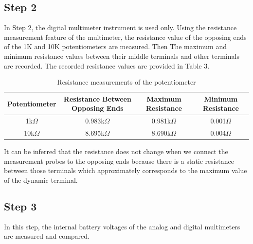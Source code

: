 \documentclass[letterpaper,12pt]{article}
\begin{document}
\subsection{Step 2}
In Step 2, the digital multimeter instrument is used only. Using the resistance measurement feature of the multimeter, the resistance value of the opposing ends of the 1K and 10K potentiometers are measured. Then The maximum and minimum resistance values between their middle terminals and other terminals are recorded.
The recorded resistance values are provided in Table 3.
\begin{table}[H]
	\begin{center}
		\caption{Resistance measurements of the potentiometer}
		\vspace{2mm}
		\begin{tabular}{|| c | c | c | c ||} 
		 \hline
		 Potentiometer & Resistance Between Opposing Ends &  Maximum Resistance & Minimum Resistance\\ [0.5ex] 
		 \hline\hline
		 1k\( \Omega \) & 0.983k\( \Omega \) & 0.981k\( \Omega \) & 0.001\( \Omega \) \\ 
		 \hline
	     10k\( \Omega \) & 8.695k\( \Omega \) & 8.690k\( \Omega \) & 0.004\( \Omega \)  \\
		 \hline
		\end{tabular}
	\end{center}
	\end{table}
It can be inferred that the resistance does not change when we connect the measurement probes to the opposing ends because there is a static resistance between those terminals which approximately corresponds to the maximum value of the dynamic terminal.  
\subsection{Step 3}
In this step, the internal battery voltages of the analog and digital multimeters are measured and compared.
\end{document}
